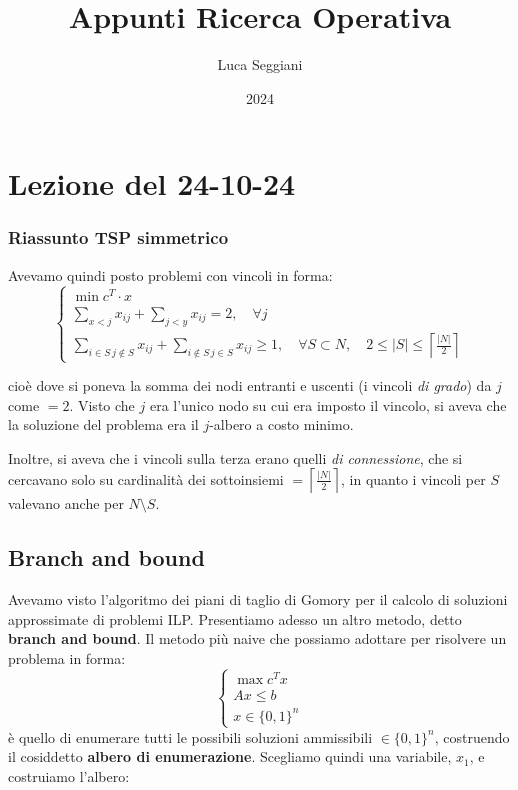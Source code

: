 \documentclass[a4paper,11pt]{article}
\title{Appunti Ricerca Operativa}
\author{Luca Seggiani}
\date{2024}
\begin{document}
\section{Lezione del 24-10-24}

\thispagestyle{empty}
\pagestyle{fancy}

\subsubsection{Riassunto TSP simmetrico}
Avevamo quindi posto problemi con vincoli  in forma:
\[
	\begin{cases}
			\min c^T \cdot x \\ 
			\sum\limits_{x < j} x_{ij} + \sum\limits_{j < y} x_{ij} = 2, \quad \forall j \\ 
			\sum\limits_{i \in S \, j \notin S} x_{ij} + \sum\limits_{i \notin S \, j \in S} x_{ij} \geq 1, \quad \forall S \subset N, \quad 2 \leq |S| \leq \left\lceil \frac{|N|}{2} \right\rceil  
	\end{cases}
\]

cioè dove si poneva la somma dei nodi entranti e uscenti (i vincoli \textit{di grado}) da $j$ come $=2$.
Visto che $j$ era l'unico nodo su cui era imposto il vincolo, si aveva che la soluzione del problema era il $j$-albero a costo minimo.

Inoltre, si aveva che i vincoli sulla terza erano quelli \textit{di connessione}, che si cercavano solo su cardinalità dei sottoinsiemi $= \left\lceil \frac{|N|}{2} \right\rceil $, in quanto i vincoli per $S$ valevano anche per $N \setminus S$. 

\subsection{Branch and bound}
Avevamo visto l'algoritmo dei piani di taglio di Gomory per il calcolo di soluzioni approssimate di problemi ILP.
Presentiamo adesso un altro metodo, detto \textbf{branch and bound}.
Il metodo più naive che possiamo adottare per risolvere un problema in forma:
\[
	\begin{cases}
		\max c^T x \\ 
		A x\leq b \\ 
		x \in \{0, 1\}^n
	\end{cases}
\]
è quello di enumerare tutti le possibili soluzioni ammissibili $\in \{0,1\}^n$, costruendo il cosiddetto \textbf{albero di enumerazione}.
Scegliamo quindi una variabile, $x_1$, e costruiamo l'albero:
\end{document}
